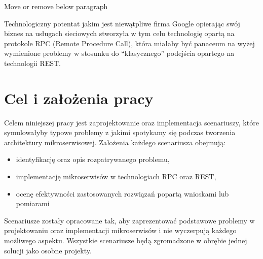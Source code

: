\centerline{Move or remove below paragraph}
\par Technologiczny potentat jakim jest niewątpliwe firma Google opierając swój biznes na usługach sieciowych stworzyła w tym celu technologię opartą na protokole RPC (Remote Procedure Call), która miałaby być panaceum na wyżej wymienione problemy w stosunku do \enquote{klasycznego} podejścia opartego na technologii REST\@.
\section{Cel i założenia pracy}
Celem niniejszej pracy jest zaprojektowanie oraz implementacja scenariuszy, które symulowałyby typowe problemy z jakimi spotykamy się podczas tworzenia architektury mikroserwisowej. Założenia każdego scenariusza obejmują:
\begin{itemize}
	\item identyfikację oraz opis rozpatrywanego problemu,
	\item implementację mikroserwisów w technologiach RPC oraz REST,
	\item ocenę efektywności zastosowanych rozwiązań popartą wnioskami lub pomiarami
\end{itemize}
\par Scenariusze zostały opracowane tak, aby zaprezentować podstawowe problemy w projektowaniu oraz implementacji mikroserwisów i nie wyczerpują każdego możliwego aspektu. Wszystkie scenariusze będą zgromadzone w obrębie jednej solucji jako osobne projekty.